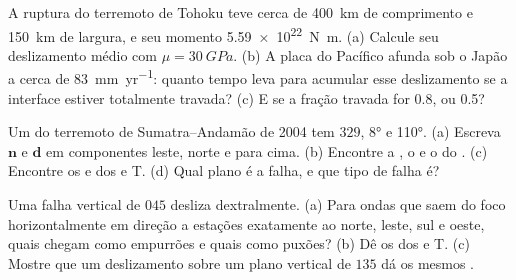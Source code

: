 \begin{exercise}[$\star\star$]\label{exo:b1:earthquake-source:6}
A ruptura do terremoto de Tohoku teve cerca de \qty{400}{km} de comprimento e \qty{150}{km} de largura, e seu momento \qty{5.59e22}{N.m}. (a) Calcule seu deslizamento médio com $\mu = \qty{30}{GPa}$. (b) A placa do Pacífico afunda sob o Japão a cerca de \qty{83}{mm.yr^{-1}}: quanto tempo leva para acumular esse deslizamento se a interface estiver totalmente travada? (c) E se a fração travada for 0.8, ou 0.5?
\end{exercise}

\begin{exercise}[$\star\star$]\label{exo:b1:earthquake-source:7}
Um  do terremoto de Sumatra--Andamão de 2004 tem  $329$,  \ang{8} e  \ang{110}. (a) Escreva $\mathbf n$ e $\mathbf d$ em componentes leste, norte e para cima. (b) Encontre a , o  e o  do . (c) Encontre os  e  dos  e T. (d) Qual plano é a falha, e que tipo de falha é?
\end{exercise}

\begin{exercise}[$\star\star$]\label{exo:b1:earthquake-source:8}
Uma falha vertical de  $045$ desliza dextralmente. (a) Para ondas que saem do foco horizontalmente em direção a estações exatamente ao norte, leste, sul e oeste, quais chegam como empurrões e quais como puxões? (b) Dê os  dos  e T. (c) Mostre que um deslizamento  sobre um plano vertical de  $135$ dá os mesmos .
\end{exercise}

